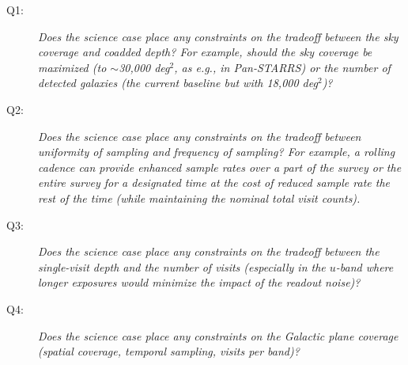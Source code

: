 \begin{description}

\item[Q1:] {\it Does the science case place any constraints on the
tradeoff between the sky coverage and coadded depth? For example, should
the sky coverage be maximized (to $\sim$30,000 deg$^2$, as e.g., in
Pan-STARRS) or the number of detected galaxies (the current baseline but
with 18,000 deg$^2$)?}


\item[Q2:] {\it Does the science case place any constraints on the
tradeoff between uniformity of sampling and frequency of sampling? For
example, a rolling cadence can provide enhanced sample rates over a part
of the survey or the entire survey for a designated time at the cost of
reduced sample rate the rest of the time (while maintaining the nominal
total visit counts).}


\item[Q3:] {\it Does the science case place any constraints on the
tradeoff between the single-visit depth and the number of visits
(especially in the $u$-band where longer exposures would minimize the
impact of the readout noise)?}


\item[Q4:] {\it Does the science case place any constraints on the
Galactic plane coverage (spatial coverage, temporal sampling, visits per
band)?}


\end{description}
